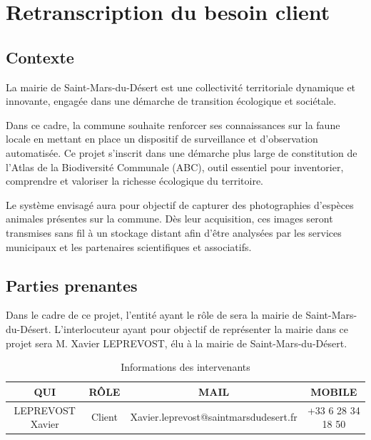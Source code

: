 \section{Retranscription du besoin client}
\small

\subsection{Contexte}
La mairie de Saint-Mars-du-Désert est une collectivité territoriale dynamique et innovante, engagée dans une démarche de transition écologique et sociétale.
\newline

Dans ce cadre, la commune souhaite renforcer ses connaissances sur la faune locale en mettant en place un dispositif de surveillance et d'observation automatisée.
Ce projet s'inscrit dans une démarche plus large de constitution de l'Atlas de la Biodiversité Communale (ABC), outil essentiel pour inventorier, comprendre et valoriser la richesse écologique du territoire.
\newline

Le système envisagé aura pour objectif de capturer des photographies d’espèces animales présentes sur la commune. Dès leur acquisition, ces images seront transmises sans fil à un stockage distant afin d’être analysées par les services municipaux et les partenaires scientifiques et associatifs.
\newline

\subsection{Parties prenantes}
Dans le cadre de ce projet, l'entité ayant le rôle de  sera la mairie de Saint-Mars-du-Désert.
L'interlocuteur ayant pour objectif de représenter la mairie dans ce projet sera M. Xavier LEPREVOST, élu à la mairie de Saint-Mars-du-Désert.
\newline

\begin{table}[h!]
   \centering
   \renewcommand{\arraystretch}{1.2} %
   \begin{tabular}{|c|c|c|c|}
      \hline
      \textbf{QUI}     & \textbf{RÔLE} & \textbf{MAIL}                         & \textbf{MOBILE}   \\
      \hline
      LEPREVOST Xavier & Client        & Xavier.leprevost@saintmarsdudesert.fr & +33 6 28 34 18 50 \\
      \hline
   \end{tabular}
   \caption{Informations des intervenants}
   \label{tab:intervenants}
\end{table}

